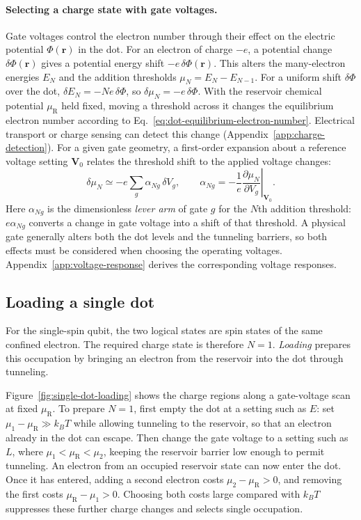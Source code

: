 \paragraph{Selecting a charge state with gate voltages.}
Gate voltages control the electron number through their effect on
the electric potential $\Phi(\mathbf r)$ in the dot. For an electron
of charge $-e$, a potential change $\delta\Phi(\mathbf r)$ gives a
potential energy shift $-e\,\delta\Phi(\mathbf r)$. This alters the many-electron energies
$E_N$ and the addition thresholds $\mu_N=E_N-E_{N-1}$.
For a uniform shift $\delta\Phi$ over the dot,
$\delta E_N=-Ne\,\delta\Phi$, so $\delta\mu_N=-e\,\delta\Phi$.
With the reservoir chemical potential $\mu_{\mathrm R}$ held fixed,
moving a threshold across it changes the equilibrium electron
number according to Eq.~\eqref{eq:dot-equilibrium-electron-number}.
Electrical transport or charge sensing can detect this change
(Appendix~\ref{app:charge-detection}). For a given gate geometry,
a first-order expansion about a reference voltage setting
$\mathbf V_0$ relates the threshold shift to the applied voltage changes:
\begin{equation}
 \delta\mu_N\simeq-e\sum_g\alpha_{Ng}\,\delta V_g,
 \qquad
 \alpha_{Ng}=-\frac1e
       \left.\frac{\partial\mu_N}{\partial V_g}\right|_{\mathbf V_0}.
 \label{eq:platform-gate-response}
\end{equation}
Here $\alpha_{Ng}$ is the dimensionless \emph{lever arm} of gate $g$
for the $N$th addition threshold: $e\alpha_{Ng}$ converts a change
in gate voltage into a shift of that threshold. A physical gate
generally alters both the dot levels and the tunneling barriers,
so both effects must be considered when choosing the operating
voltages. Appendix~\ref{app:voltage-response} derives the corresponding
voltage responses.

\subsection{Loading a single dot}
\label{sec:single-dot-loading}

For the single-spin qubit, the two logical states are spin states
of the same confined electron. The required charge state is therefore
$N=1$. \emph{Loading} prepares this occupation by bringing an electron
from the reservoir into the dot through tunneling.

Figure~\ref{fig:single-dot-loading} shows the charge regions along
a gate-voltage scan at fixed $\mu_{\mathrm R}$. To prepare $N=1$,
first empty the dot at a setting such as $E$:
set $\mu_1-\mu_{\mathrm R}\gg k_BT$ while allowing tunneling to the reservoir,
so that an electron already in the dot can escape. Then change the
gate voltage to a setting such as $L$, where
$\mu_1<\mu_{\mathrm R}<\mu_2$, keeping the reservoir barrier low
enough to permit tunneling. An electron from an occupied reservoir
state can now enter the dot. Once it has entered, adding a second
electron costs $\mu_2-\mu_{\mathrm R}>0$, and removing the first
costs $\mu_{\mathrm R}-\mu_1>0$. Choosing both costs large compared
with $k_BT$ suppresses these further charge changes and selects
single occupation.


